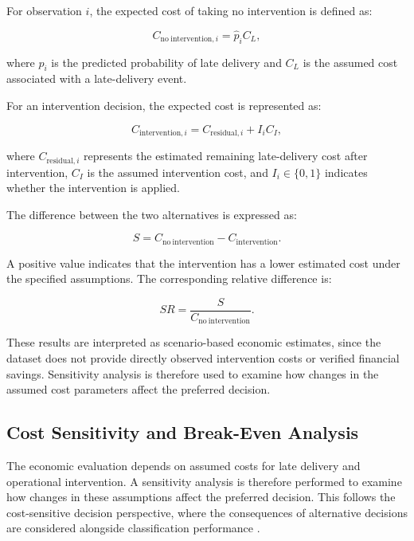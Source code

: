 \documentclass[manuscript, screen, review]{acmart}
\begin{document}
For observation $i$, the expected cost of taking no intervention is
defined as:

\begin{equation}
C_{\mathrm{no\ intervention},i}
=
\hat{p}_i C_L,
\label{eq:baseline_cost}
\end{equation}

where $\hat{p}_i$ is the predicted probability of late delivery and
$C_L$ is the assumed cost associated with a late-delivery event.

For an intervention decision, the expected cost is represented as:

\begin{equation}
C_{\mathrm{intervention},i}
=
C_{\mathrm{residual},i}
+
I_i C_I,
\label{eq:decision_cost}
\end{equation}

where $C_{\mathrm{residual},i}$ represents the estimated remaining
late-delivery cost after intervention, $C_I$ is the assumed intervention
cost, and $I_i\in\{0,1\}$ indicates whether the intervention is applied.

The difference between the two alternatives is expressed as:

\begin{equation}
S =
C_{\mathrm{no\ intervention}}
-
C_{\mathrm{intervention}}.
\label{eq:saving}
\end{equation}

A positive value indicates that the intervention has a lower estimated
cost under the specified assumptions. The corresponding relative
difference is:

\begin{equation}
SR =
\frac{S}{C_{\mathrm{no\ intervention}}}.
\end{equation}

These results are interpreted as scenario-based economic estimates,
since the dataset does not provide directly observed intervention
costs or verified financial savings. Sensitivity analysis is therefore
used to examine how changes in the assumed cost parameters affect the
preferred decision.

\subsection{Cost Sensitivity and Break-Even Analysis}

The economic evaluation depends on assumed costs for late delivery and
operational intervention. A sensitivity analysis is therefore performed
to examine how changes in these assumptions affect the preferred
decision. This follows the cost-sensitive decision perspective, where
the consequences of alternative decisions are considered alongside
classification performance \cite{elkan2001foundations}.
\end{document}
